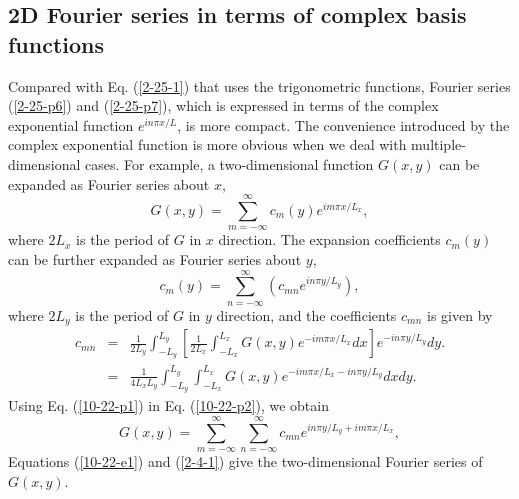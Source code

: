 \documentclass{article}
\begin{document}
\subsection{2D Fourier series in terms of complex basis functions}

Compared with Eq. (\ref{2-25-1}) that uses the trigonometric functions,
Fourier series (\ref{2-25-p6}) and (\ref{2-25-p7}), which is expressed in
terms of the complex exponential function $e^{i n \pi x / L}$, is more
compact. The convenience introduced by the complex exponential function is
more obvious when we deal with multiple-dimensional cases. For example, a
two-dimensional function $G (x, y)$ can be expanded as Fourier series about
$x$,
\begin{equation}
  \label{10-22-p2} G (x, y) = \sum_{m = - \infty}^{\infty} c_m (y) e^{i m \pi
  x / L_x},
\end{equation}
where $2 L_x$ is the period of $G$ in $x$ direction. The expansion
coefficients $c_m (y)$ can be further expanded as Fourier series about $y$,
\begin{equation}
  \label{10-22-p1} c_m (y) = \sum_{n = - \infty}^{\infty} (c_{m n} e^{i n \pi
  y / L_y}),
\end{equation}
where $2 L_y$ is the period of $G$ in $y$ direction, and the coefficients
$c_{m n}$ is given by
\begin{eqnarray}
  c_{m n} & = & \frac{1}{2 L_y} \int_{- L_y}^{L_y} \left[ \frac{1}{2 L_x}
  \int_{- L_x}^{L_x} G (x, y) e^{- i m \pi x / L_x} d x \right] e^{- i n \pi y
  / L_y} d y. \nonumber\\
  & = & \frac{1}{4 L_x L_y} \int_{- L_y}^{L_y} \int_{- L_x}^{L_x} G (x, y)
  {e^{- i m \pi x / L_x - i n \pi y / L_y}}  d x d y.  \label{2-4-1}
\end{eqnarray}
Using Eq. (\ref{10-22-p1}) in Eq. (\ref{10-22-p2}), we obtain
\begin{equation}
  \label{10-22-e1} G (x, y) = \sum_{m = - \infty}^{\infty} \sum_{n = -
  \infty}^{\infty} c_{m n} e^{i n \pi y / L_y + i m \pi x / L_x},
\end{equation}
Equations (\ref{10-22-e1}) and (\ref{2-4-1}) give the two-dimensional Fourier
series of $G (x, y)$.
\end{document}
